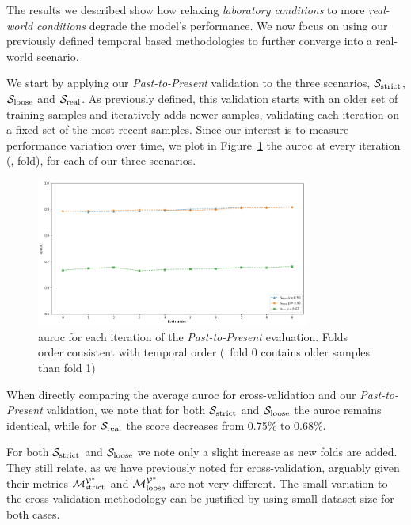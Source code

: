 The results we described show how relaxing \textit{laboratory conditions} to more \textit{real-world conditions} degrade the model's performance.
We now focus on using our previously defined temporal based methodologies to further converge into a real-world scenario.

\medskip

We start by applying our \textit{Past-to-Present} validation to the three scenarios, $\mathcal{S}_{\mathrm{strict}}$, $\mathcal{S}_{\mathrm{loose}}$ and $\mathcal{S}_{\mathrm{real}}$.
As previously defined, this validation starts with an older set of training samples and iteratively adds newer samples, validating each iteration on a fixed set of the most recent samples.
Since our interest is to measure performance variation over time, we plot in Figure~\ref{fig:pastpresent} the \gls{auroc} at every iteration (\ie, fold), for each of our three scenarios.

\begin{figure}[!htb]
	\centering
	\includegraphics[width=0.8\textwidth]{Figures/pastpresent.png}
	\caption[Single layer results for static features in \textit{Past-to-Present}.]{\gls{auroc} for each iteration of the \textit{Past-to-Present} evaluation. Folds order consistent with temporal order (\ie\ fold 0 contains older samples than
fold 1)}
	\label{fig:pastpresent}
\end{figure}

When directly comparing the average \gls{auroc} for cross-validation and our \textit{Past-to-Present} validation, we note that for both $\mathcal{S}_{\mathrm{strict}}$ and $\mathcal{S}_{\mathrm{loose}}$ the \gls{auroc} remains identical, while for $\mathcal{S}_{\mathrm{real}}$ the score decreases from 0.75\% to 0.68\%.

For both $\mathcal{S}_{\mathrm{strict}}$ and $\mathcal{S}_{\mathrm{loose}}$ we note only a slight increase as new folds are added.
They still relate, as we have previously noted for cross-validation, arguably given their metrics $\mathcal{M}_{\mathrm{strict}}^{\mathcal{V}^*}$ and $\mathcal{M}_{\mathrm{loose}}^{\mathcal{V}^*}$ are not very different.
The small variation to the cross-validation methodology can be justified by using small dataset size for both cases.

